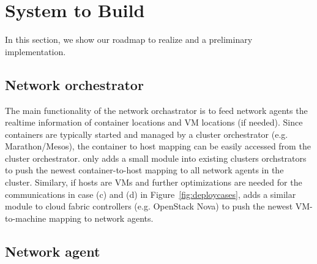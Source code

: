 \section{System to Build} \label{sec:promise}


In this section, we show our roadmap to realize \sysname and a preliminary 
implementation.

\subsection{Network orchestrator}

The main functionality of the network orchastrator is to feed network agents
the realtime information of container locations and VM locations (if needed).
Since containers are typically started and managed by a cluster orchestrator
(e.g. Marathon/Mesos), the container to host mapping can be easily accessed
from the cluster orchestrator. \sysname only adds a small module into 
existing clusters orchstrators to push the newest container-to-host mapping
to all network agents in the cluster. Similary, if hosts are VMs and further optimizations are needed for the communications in case (c) and (d) in 
Figure~\ref{fig:deploycases}, \sysname adds a similar module to cloud fabric
controllers (e.g. OpenStack Nova) to push the newest VM-to-machine mapping
to network agents.

\subsection{Network agent}

